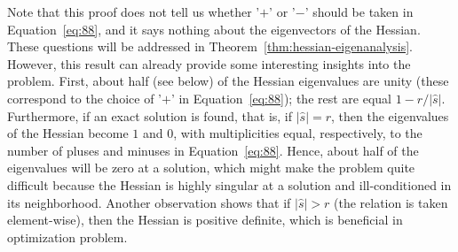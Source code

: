 Note that this proof does not tell us whether '$+$' or '$-$' should be
taken in Equation~\eqref{eq:88}, and it says nothing about the
eigenvectors of the Hessian. These questions will be addressed in
Theorem~\ref{thm:hessian-eigenanalysis}. However, this result can
already provide some interesting insights into the problem. First,
about half (see below) of the Hessian eigenvalues are unity (these
correspond to the choice of '$+$' in Equation~\eqref{eq:88}); the rest
are equal $1-r/|\hat{s}|$.  Furthermore, if an exact solution is
found, that is, if $|\hat{s}| = r$, then the eigenvalues of the
Hessian become $1$ and $0$, with multiplicities equal, respectively,
to the number of pluses and minuses in Equation~\eqref{eq:88}.  Hence,
about half of the eigenvalues will be zero at a solution, which might
make the problem quite difficult because the Hessian is highly singular
at a solution and ill-conditioned in its neighborhood. Another
observation shows that if $|\hat{s}| > r$ (the relation is taken
element-wise), then the Hessian is positive definite, which is
beneficial in optimization problem.

